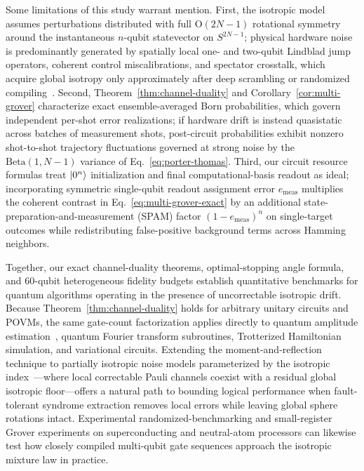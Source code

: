 Some limitations of this study warrant mention. First, the isotropic model assumes perturbations distributed with full $\mathrm{O}(2N - 1)$ rotational symmetry around the instantaneous $n$-qubit statevector on $S^{2N-1}$; physical hardware noise is predominantly generated by spatially local one- and two-qubit Lindblad jump operators, coherent control miscalibrations, and spectator crosstalk, which acquire global isotropy only approximately after deep scrambling or randomized compiling~\cite{FonsecaDeOliveira2017}. Second, Theorem~\ref{thm:channel-duality} and Corollary~\ref{cor:multi-grover} characterize exact ensemble-averaged Born probabilities, which govern independent per-shot error realizations; if hardware drift is instead quasistatic across batches of measurement shots, post-circuit probabilities exhibit nonzero shot-to-shot trajectory fluctuations governed at strong noise by the $\mathrm{Beta}(1, N - 1)$ variance of Eq.~\eqref{eq:porter-thomas}. Third, our circuit resource formulas treat $\ket{0^n}$ initialization and final computational-basis readout as ideal; incorporating symmetric single-qubit readout assignment error $e_{\mathrm{meas}}$ multiplies the coherent contrast in Eq.~\eqref{eq:multi-grover-exact} by an additional state-preparation-and-measurement (SPAM) factor $(1 - e_{\mathrm{meas}})^n$ on single-target outcomes while redistributing false-positive background terms across Hamming neighbors.

Together, our exact channel-duality theorems, optimal-stopping angle formula, and $60$-qubit heterogeneous fidelity budgets establish quantitative benchmarks for quantum algorithms operating in the presence of uncorrectable isotropic drift. Because Theorem~\ref{thm:channel-duality} holds for arbitrary unitary circuits and POVMs, the same gate-count factorization applies directly to quantum amplitude estimation~\cite{Brassard2002}, quantum Fourier transform subroutines, Trotterized Hamiltonian simulation, and variational circuits. Extending the moment-and-reflection technique to partially isotropic noise models parameterized by the isotropic index~\cite{FonsecaDeOliveira2017}---where local correctable Pauli channels coexist with a residual global isotropic floor---offers a natural path to bounding logical performance when fault-tolerant syndrome extraction removes local errors while leaving global sphere rotations intact. Experimental randomized-benchmarking and small-register Grover experiments on superconducting and neutral-atom processors can likewise test how closely compiled multi-qubit gate sequences approach the isotropic mixture law in practice.
